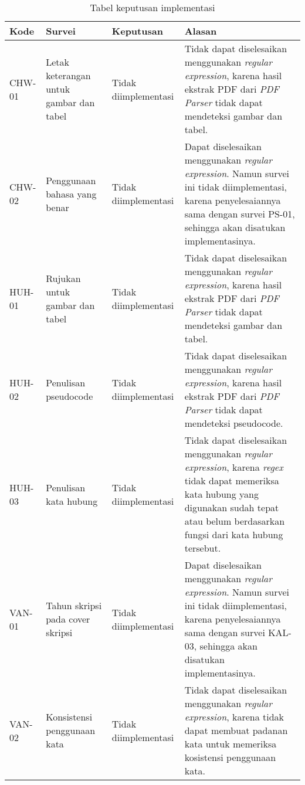 \begin{table}[H]
	\renewcommand{\arraystretch}{1.5}
	\caption {Tabel keputusan implementasi} \label{tab:keputusan3}
	\begin{center}
		\begin{tabular}{|p{1.5 cm}|>{\raggedright} p{4 cm}| p{2.5 cm}| p{6.5 cm}|}
		\hline
		Kode & Survei & Keputusan & Alasan \\ 
		\hline 
		CHW-01 & Letak keterangan untuk gambar dan tabel & Tidak \newline diimplementasi & Tidak dapat diselesaikan menggunakan \textit{regular expression}, karena hasil ekstrak PDF dari \textit{PDF Parser} tidak dapat mendeteksi gambar dan tabel.\newline \\ 
		\hline 
		CHW-02 & Penggunaan bahasa yang benar & Tidak \newline diimplementasi & Dapat diselesaikan menggunakan \textit{regular expression}. Namun survei ini tidak diimplementasi, karena penyelesaiannya sama dengan survei PS-01, sehingga akan disatukan implementasinya. \newline \\		
		\hline
		HUH-01 & Rujukan untuk gambar dan tabel & Tidak \newline diimplementasi & Tidak dapat diselesaikan menggunakan \textit{regular expression}, karena hasil ekstrak PDF dari \textit{PDF Parser} tidak dapat mendeteksi gambar dan tabel. \newline \\ 
		\hline 
		HUH-02 & Penulisan pseudocode & Tidak \newline diimplementasi & Tidak dapat diselesaikan menggunakan \textit{regular expression}, karena hasil ekstrak PDF dari \textit{PDF Parser} tidak dapat mendeteksi pseudocode. \newline \\ 
		\hline 
		HUH-03 & Penulisan kata hubung & Tidak \newline diimplementasi & Tidak dapat diselesaikan menggunakan \textit{regular expression}, karena \textit{regex} tidak dapat memeriksa kata hubung yang digunakan sudah tepat atau belum berdasarkan fungsi dari kata hubung tersebut. \newline \\ 
		\hline 
		VAN-01 & Tahun skripsi pada cover skripsi & Tidak \newline diimplementasi & Dapat diselesaikan menggunakan \textit{regular expression}. Namun survei ini tidak diimplementasi, karena penyelesaiannya sama dengan survei KAL-03, sehingga
akan disatukan implementasinya. \newline \\ 
		\hline 
		VAN-02 & Konsistensi penggunaan kata & Tidak \newline diimplementasi & Tidak dapat diselesaikan menggunakan \textit{regular expression}, karena tidak dapat membuat padanan kata untuk memeriksa kosistensi penggunaan kata. \newline \\ 
		\hline
		\end{tabular}
	\end{center}
\end{table}


